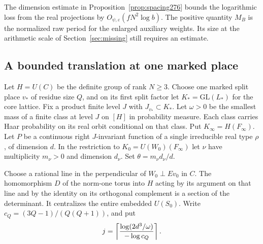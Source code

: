 \documentclass[a4paper,11pt]{article}
\theoremstyle{definition}
\theoremstyle{remark}
\numberwithin{equation}{section}
\begin{document}
The dimension estimate in Proposition~\ref{prop:spacing276}
bounds the logarithmic loss from the real projections by
\(O_{\psi,\varepsilon}(fN^2\log b)\). The positive quantity
\(M_B\) is the normalized raw period for the enlarged
auxiliary weights. Its size at the arithmetic scale of
Section~\ref{sec:missing} still requires an estimate.

\subsection{A bounded translation at one marked place}\label{nav:VII-49}
Let \(H=U(C)\) be the definite group of rank \(N\ge3\).
Choose one marked split place \(v_*\) of residue size \(Q\),
and on its first split factor let \(K_*=\mathrm{GL}(L_*)\)
for the core lattice. Fix a product finite level \(J\) with
\(J_{v_*}\subset K_*\). Let \(\omega>0\) be the smallest
mass of a finite class at level \(J\) on \([H]\) in probability
measure. Each class carries Haar probability on its real
orbit conditional on that class. Put \(K_\infty=H(F_\infty)\).
Let \(P\) be a continuous right \(J\)-invariant function of a single
irreducible real type \(\rho\), of dimension \(d\). In the
restriction to \(K_0=U(W_0)(F_\infty)\) let \(\nu\) have
multiplicity \(m_\nu>0\) and dimension \(d_\nu\).
Set \(\theta=m_\nu d_\nu/d\).

Choose a rational line in the perpendicular of \(W_0\perp Ev_0\)
in \(C\). The homomorphism \(D\) of the norm-one torus into
\(H\) acting by its argument on that line and by the identity
on its orthogonal complement is a section of the determinant.
It centralizes the entire embedded \(U(S_0)\).
Write \(c_Q=(3Q-1)/(Q(Q+1))\), and put
\[
    j=\left\lceil{\log(2d^3/\omega)\over-\log c_Q}\right\rceil .
\]
\end{document}
